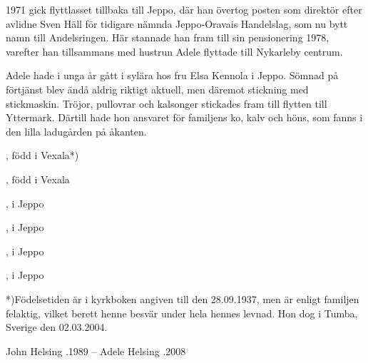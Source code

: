 1971 gick flyttlasset tillbaka till Jeppo, där han övertog posten som	direktör efter avlidne Sven Häll för tidigare nämnda Jeppo-Oravais	Handelslag, som nu bytt namn till Andelsringen. Här stannade han	fram till sin pensionering 1978, varefter han tillsammans med hustrun Adele flyttade till Nykarleby centrum.

Adele hade i unga år gått i sylära hos fru Elsa Kennola i Jeppo.	Sömnad på förtjänst blev ändå aldrig riktigt aktuell, men däremot	stickning med stickmaskin. Tröjor, pullovrar och kalsonger stickades fram till flytten till Yttermark. Därtill hade hon ansvaret för familjens ko, kalv och höns, som fanns i den lilla ladugården på åkanten.
\begin{jhchildren}
  \item {}, född i Vexala*)
  \item {}, född i Vexala
  \item {}, i Jeppo
  \item {}, i Jeppo
  \item {}, i Jeppo
  \item {}, i Jeppo
\end{jhchildren}

*)Födelsetiden är i kyrkboken angiven till den 28.09.1937, men är	enligt familjen felaktig, vilket berett henne besvär under hela hennes	levnad. Hon dog i Tumba, Sverige den 02.03.2004.

John Helsing .1989  --  Adele Helsing .2008
